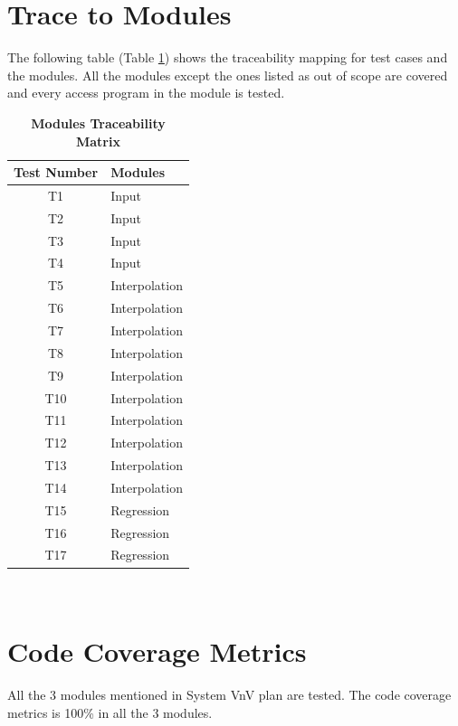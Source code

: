 \documentclass[12pt, titlepage]{article}
\begin{document}
\section{Trace to Modules}	

The following table (Table \ref{Table:Table_TraceabilityM}) shows the 
traceability mapping for test cases and the 
modules. All the modules except the ones listed as out of scope are 
covered and 
every access program in the module is tested. 

\begin{table}
	\caption{\textbf{Modules Traceability Matrix}}
	\label{Table:Table_TraceabilityM}  
	\begin{tabular}{|c|p{5cm}|}
		\hline	
		\textbf{Test Number} & \textbf{Modules} \\
		\hline 
		T1&  Input      \\ \hline
		T2&  Input      \\ \hline
		T3&  Input     \\ \hline
		T4&  Input     \\ \hline
		T5&  Interpolation      \\ \hline
		T6&  Interpolation     \\ \hline
		T7&  Interpolation     \\ \hline
		T8&  Interpolation      \\ \hline
		T9&  Interpolation     \\ \hline
		T10& Interpolation      \\ \hline
		T11& Interpolation      \\ \hline
		T12& Interpolation     \\ \hline
		T13& Interpolation     \\ \hline
		T14& Interpolation      \\ \hline
		T15& Regression     \\ \hline
		T16& Regression     \\ \hline
		T17& Regression      \\ \hline
		
	\end{tabular}\\
\end{table}




\section{Code Coverage Metrics} 

All the 3 modules mentioned in System VnV plan are tested. The code 
coverage 
metrics is 100\% in all the 3 modules. 

%

%
\end{document}
